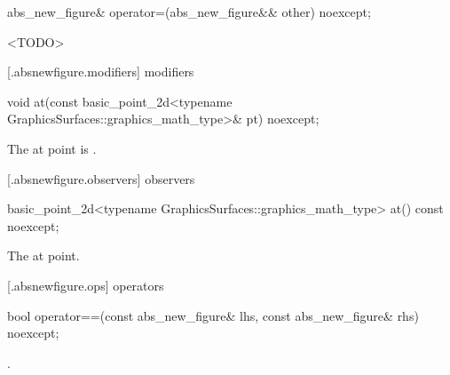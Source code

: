 %
\begin{itemdecl}
abs_new_figure& operator=(abs_new_figure&& other) noexcept;
\end{itemdecl}
\begin{itemdescr}
\pnum
\effects
<TODO>

\pnum
\returns
{}
\end{itemdescr}

 [\iotwod.absnewfigure.modifiers]{ modifiers}%

%
\begin{itemdecl}
void at(const basic_point_2d<typename GraphicsSurfaces::graphics_math_type>& pt) noexcept;
\end{itemdecl}
\begin{itemdescr}
\pnum
\effects
The at point is .
\end{itemdescr}

 [\iotwod.absnewfigure.observers]{ observers}%

%
\begin{itemdecl}
basic_point_2d<typename GraphicsSurfaces::graphics_math_type> at() const noexcept;
\end{itemdecl}
\begin{itemdescr}
\pnum
\returns
The at point.
\end{itemdescr}

 [\iotwod.absnewfigure.ops]{ operators}%

%
\begin{itemdecl}
bool operator==(const abs_new_figure& lhs, const abs_new_figure& rhs) noexcept;
\end{itemdecl}
\begin{itemdescr}
\pnum
\returns
{}.
\end{itemdescr}
